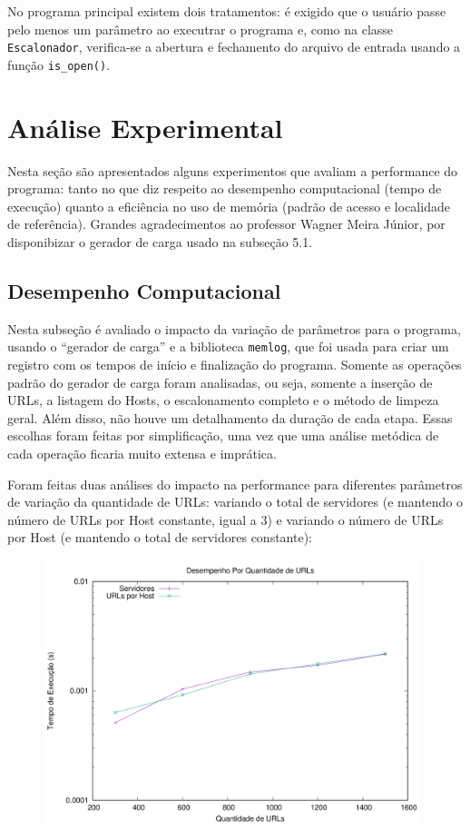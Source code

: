 \documentclass{article}
\def\code#1{\texttt{#1}}
\begin{document}
No programa principal existem dois tratamentos: é exigido que o usuário passe pelo menos um parâmetro ao executrar o programa e, como na classe \code{Escalonador}, verifica-se a abertura e fechamento do arquivo de entrada usando a função \code{is\_open()}. 

\section{Análise Experimental}

Nesta seção são apresentados alguns experimentos que avaliam a performance do programa: tanto no que diz respeito ao desempenho computacional (tempo de execução) quanto a eficiência no uso de memória (padrão de acesso
e localidade de referência). Grandes agradecimentos ao professor Wagner Meira Júnior, por disponibizar o gerador de carga usado na subseção 5.1.

\subsection{Desempenho Computacional}

Nesta subseção é avaliado o impacto da variação de parâmetros para o programa, usando o ``gerador de carga'' e a biblioteca \code{memlog}, que foi usada para criar um registro com os tempos de início e finalização do programa. Somente as operações padrão do gerador de carga foram analisadas, ou seja, somente a inserção de URLs, a listagem do Hosts, o escalonamento completo e o método de limpeza geral. Além disso, não houve um detalhamento da duração de cada etapa. Essas escolhas foram feitas por simplificação, uma vez que uma análise metódica de cada operação ficaria muito extensa e imprática.

Foram feitas duas análises do impacto na performance para diferentes parâmetros de variação da quantidade de URLs: variando o total de servidores (e mantendo o número de URLs por Host constante, igual a 3) e variando o número de URLs por Host (e mantendo o total de servidores constante):

\begin{figure} [H]
    \includegraphics[width=11cm]{comp-perf.png} 
    \centering
\end{figure}
\end{document}
